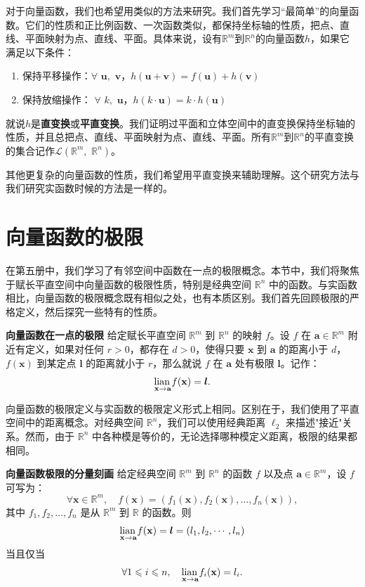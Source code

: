 \documentclass[12pt,UTF8]{ctexbook}
\begin{document}
对于向量函数，我们也希望用类似的方法来研究。我们首先学习“最简单”的向量函数。它们的性质和正比例函数、一次函数类似，都保持坐标轴的性质，把点、直线、平面映射为点、直线、平面。具体来说，设有$\mathbb{R}^m$到$\mathbb{R}^n$的向量函数$h$，如果它满足以下条件：
\begin{enumerate}
    \item 保持平移操作：$\forall \,\,\mathbf{u}, \,\,\mathbf{v}$，$h(\mathbf{u} + \mathbf{v}) = f(\mathbf{u}) + h(\mathbf{v})$
    \item 保持放缩操作： $\forall \,\,k, \,\, \mathbf{u}$，$h(k\cdot \mathbf{u}) = k \cdot h(\mathbf{u})$
\end{enumerate}
就说$h$是\textbf{直变换}或\textbf{平直变换}。我们证明过平面和立体空间中的直变换保持坐标轴的性质，并且总把点、直线、平面映射为点、直线、平面。所有$\mathbb{R}^m$到$\mathbb{R}^n$的平直变换的集合记作$\mathcal{L}(\mathbb{R}^m, \,\,\mathbb{R}^n)$。

其他更复杂的向量函数的性质，我们希望用平直变换来辅助理解。这个研究方法与我们研究实函数时候的方法是一样的。

\section{向量函数的极限}

在第五册中，我们学习了有邻空间中函数在一点的极限概念。本节中，我们将聚焦于赋长平直空间中向量函数的极限性质，特别是经典空间 $\mathbb{R}^n$ 中的函数。与实函数相比，向量函数的极限概念既有相似之处，也有本质区别。我们首先回顾极限的严格定义，然后探究一些特有的性质。

\begin{df}{\textbf{向量函数在一点的极限}}
给定赋长平直空间 $\mathbb{R}^m$ 到 $\mathbb{R}^n$ 的映射 $f$。设 $f$ 在 $\mathbf{a}\in\mathbb{R}^m$ 附近有定义，如果对任何 $r>0$，都存在 $d>0$，使得只要 $\mathbf{x}$ 到 $\mathbf{a}$ 的距离小于 $d$，$f(\mathbf{x})$ 到某定点 $\boldsymbol{l}$ 的距离就小于 $r$，那么就说 $f$ 在 $\mathbf{a}$ 处有极限 $\boldsymbol{l}$。记作：
$$ \underset{\mathbf{x}\to \mathbf{a}}{\operatorname{lian}\,} f(\mathbf{x}) = \boldsymbol{l}. $$
\end{df}

向量函数的极限定义与实函数的极限定义形式上相同。区别在于，我们使用了平直空间中的距离概念。对经典空间 $\mathbb{R}^n$，我们可以使用经典距离 $\ell_2$ 来描述"接近"关系。然而，由于 $\mathbb{R}^n$ 中各种模是等价的，无论选择哪种模定义距离，极限的结果都相同。

\begin{tm}{\textbf{向量函数极限的分量刻画}}
给定经典空间 $\mathbb{R}^m$ 到 $\mathbb{R}^n$ 的函数 $f$ 以及点 $\mathbf{a}\in\mathbb{R}^m$，设 $f$ 可写为：
$$ \forall \mathbf{x} \in \mathbb{R}^m, \quad f(\mathbf{x}) = (f_1(\mathbf{x}), f_2(\mathbf{x}), \ldots, f_n(\mathbf{x})), $$
其中 $f_1, f_2, \ldots, f_n$ 是从 $\mathbb{R}^m$ 到 $\mathbb{R}$ 的函数。则
$$ \underset{\mathbf{x}\to \mathbf{a}}{\operatorname{lian}\,} f(\mathbf{x}) = \boldsymbol{l} = (l_1, l_2, \cdots, l_n) $$
当且仅当
$$ \forall 1 \leqslant i \leqslant n, \quad \underset{\mathbf{x}\to \mathbf{a}}{\operatorname{lian}\,} f_i(\mathbf{x}) = l_i. $$
\end{tm}
\end{document}

